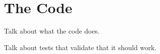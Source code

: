 \documentclass[etd,oneside,senior]{BYUPhys}
\begin{document}
\chapter{The Code}\label{chap:code} %

Talk about what the code does.

Talk about tests that validate that it should work.






\end{document}
